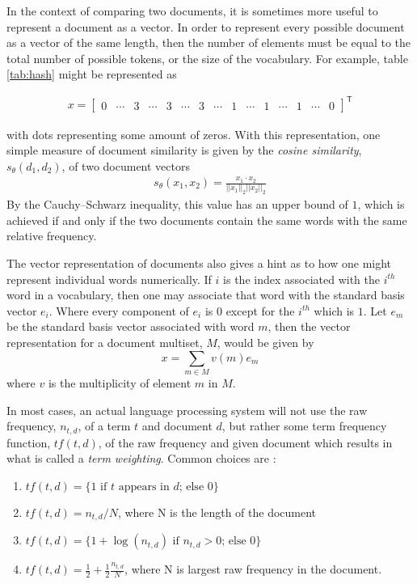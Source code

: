 In the context of comparing two documents, it is sometimes more useful to represent a document as a vector.  In order to represent every possible document as a vector of the same length, then the number of elements must be equal to the total number of possible tokens, or the size of the vocabulary.  For example, table \ref{tab:hash} might be represented as 
\begin{singlespace}
\begin{align}
x = 
\begin{bmatrix}
0 & \cdots & 3 & \cdots & 3 & \cdots & 3 & \cdots & 1 & \cdots & 1 & \cdots & 1 & \cdots & 0
\end{bmatrix}^\mathsf{T}
\end{align}
\end{singlespace}
\noindent
with dots representing some amount of zeros.  With this representation, one simple measure of document similarity is given by the \textit{cosine similarity}, $s_\theta(d_1,d_2)$, of two document vectors
\begin{align}
s_\theta(x_1,x_2) = \frac{x_1\cdot x_2}{||x_1||_2 ||x_2||_2}
\end{align}
By the Cauchy–Schwarz inequality, this value has an upper bound of $1$, which is achieved if and only if the two documents contain the same words with the same relative frequency.

The vector representation of documents also gives a hint as to how one might represent individual words numerically.  If $i$ is the index associated with the $i^{th}$ word in a vocabulary, then one may associate that word with the standard basis vector $e_i$.  Where every component of $e_i$ is $0$ except for the $i^{th}$ which is $1$.  Let $e_m$ be the standard basis vector associated with word $m$, then the vector representation for a document multiset, $M$, would be given by
\begin{equation}
x = \sum_{m\in M} v(m)e_m
\end{equation}
where $v$ is the multiplicity of element $m$ in $M$.

In most cases, an actual language processing system will not use the raw frequency, $n_{t,d}$, of a term $t$ and document $d$, but rather some term frequency function, $tf(t,d)$, of the raw frequency and given document which results in what is called a \textit{term weighting}.  Common choices are \cite{cm08}:

\begin{enumerate}
\item $tf(t,d) = \{1 \text{ if $t$ appears in $d$; else } 0\}$
\item $tf(t,d) = n_{t,d} / N$, where N is the length of the document
\item $tf(t,d) = \{1 + \log(n_{t,d}) \text{ if $n_{t,d} > 0$; else } 0\}$
\item $tf(t,d) = \frac{1}{2} + \frac{1}{2} \frac{n_{t,d}}{N}$, where N is largest raw frequency in the document.
\end{enumerate}

